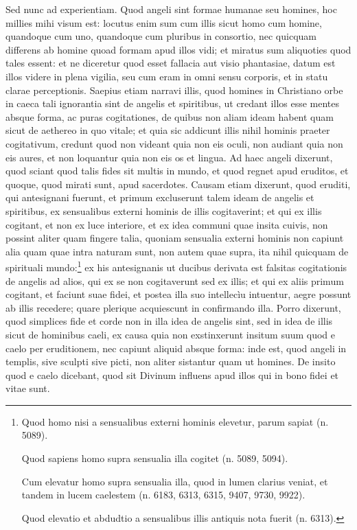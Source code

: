 \begin{topic}{74}
    Sed nunc ad experientiam.
    Quod angeli sint formae humanae seu homines, hoc millies mihi visum est: locutus enim sum cum illis sicut homo cum
    homine, quandoque cum uno, quandoque cum pluribus in consortio, nec quicquam differens ab homine quoad formam apud
    illos vidi; et miratus sum aliquoties quod tales essent: et ne diceretur quod esset fallacia aut visio phantasiae,
    datum est illos videre in plena vigilia, seu cum eram in omni sensu corporis, et in statu clarae perceptionis.
    Saepius etiam narravi illis, quod homines in Christiano orbe in caeca tali ignorantia sint de angelis et spiritibus,
    ut credant illos esse mentes absque forma, ac puras cogitationes, de quibus non aliam ideam habent quam sicut de
    aethereo in quo vitale; et quia sic addicunt illis nihil hominis praeter cogitativum, credunt quod non videant quia
    non eis oculi, non audiant quia non eis aures, et non loquantur quia non eis os et lingua.
    Ad haec angeli dixerunt, quod sciant quod talis fides sit multis in mundo, et quod regnet apud eruditos, et quoque,
    quod mirati sunt, apud sacerdotes.
    Causam etiam dixerunt, quod eruditi, qui antesignani fuerunt, et primum excluserunt talem ideam de angelis et
    spiritibus, ex sensualibus externi hominis de illis cogitaverint; et qui ex illis cogitant, et non ex luce
    interiore, et ex idea communi quae insita cuivis, non possint aliter quam fingere talia, quoniam sensualia externi
    hominis non capiunt alia quam quae intra naturam sunt, non autem quae supra, ita nihil quicquam de spirituali
    mundo:\footnote{Quod homo nisi a sensualibus externi hominis elevetur, parum sapiat (n. 5089).

    Quod sapiens homo supra sensualia illa cogitet (n. 5089, 5094).

    Cum elevatur homo supra sensualia illa, quod in lumen clarius veniat, et tandem in lucem caelestem (n. 6183, 6313,
    6315, 9407, 9730, 9922).

    Quod elevatio et abdudtio a sensualibus illis antiquis nota fuerit (n. 6313).} ex his antesignanis ut ducibus
    derivata est falsitas cogitationis de angelis ad alios, qui ex se non cogitaverunt sed ex illis; et qui ex aliis
    primum cogitant, et faciunt suae fidei, et postea illa suo intellecìu intuentur, aegre possunt ab illis recedere;
    quare plerique acquiescunt in confirmando illa.
    Porro dixerunt, quod simplices fide et corde non in illa idea de angelis sint, sed in idea de illis sicut de
    hominibus caeli, ex causa quia non exstinxerunt insitum suum quod e caelo per eruditionem, nec capiunt aliquid
    absque forma: inde est, quod angeli in templis, sive sculpti sive picti, non aliter sistantur quam ut homines.
    De insito quod e caelo dicebant, quod sit Divinum influens apud illos qui in bono fidei et vitae sunt.
\end{topic}

